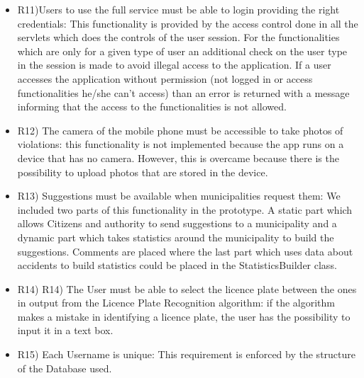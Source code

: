 \begin{itemize}
\item  R11)Users to use the full service must be able to login providing the right credentials: This functionality is provided by the
access control done in all the servlets which does the controls of the user session. For the functionalities which are only for a given type of user an additional check on the user type in the session is made to avoid illegal access to the application. If a user accesses the application without permission (not logged in or access functionalities he/she can't access) than an error is returned with a message informing that the access to the functionalities is not allowed. 

\item  R12) The camera of the mobile phone must be accessible to take photos of violations: this functionality is not implemented because the app runs on a device that has no camera. However, this is overcame because there is the possibility to upload photos that are stored in the device.

\item  R13) Suggestions must be available when municipalities request them: We included two parts of this functionality in the prototype. A static part which allows Citizens and authority to send suggestions to a municipality and a dynamic part which takes statistics around the municipality to build the suggestions. Comments are placed where the last part which uses data about accidents to build statistics could be placed in the StatisticsBuilder class.

\item  R14) R14) The User must be able to select the licence plate between the ones in output from the Licence Plate Recognition algorithm: if the algorithm makes a mistake in identifying a licence plate, the user has the possibility to input it in a text box.

\item  R15) Each Username is unique:  This requirement is enforced by the structure of the Database used.
\end{itemize}
\clearpage

